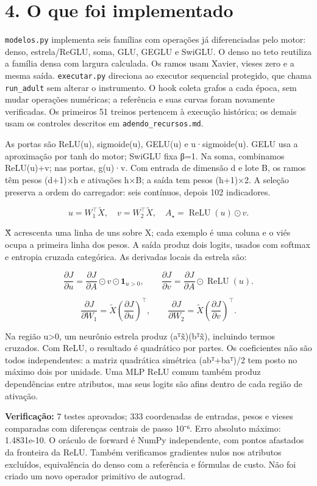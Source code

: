 \documentclass[10pt,a4paper]{article}
\begin{document}
\section*{4. O que foi implementado}
\texttt{modelos.py} implementa seis famílias com operações já diferenciadas pelo motor: denso, estrela/ReGLU, soma, GLU, GEGLU e SwiGLU. O denso no teto reutiliza a família densa com largura calculada. Os ramos usam Xavier, vieses zero e a mesma saída. \texttt{executar.py} direciona ao executor sequencial protegido, que chama \texttt{run\_\allowbreak{}adult} sem alterar o instrumento. O hook coleta grafos a cada época, sem mudar operações numéricas; a referência e suas curvas foram novamente verificadas. Os primeiros 51 treinos pertencem à execução histórica; os demais usam os controles descritos em \texttt{adendo\_\allowbreak{}recursos.md}.


As portas são ReLU(u), sigmoide(u), GELU(u) e u·sigmoide(u). GELU usa a aproximação por tanh do motor; SwiGLU fixa β=1. Na soma, combinamos ReLU(u)+v; nas portas, g(u)·v. Com entrada de dimensão d e lote B, os ramos têm pesos (d+1)×h e ativações h×B; a saída tem pesos (h+1)×2. A seleção preserva a ordem do carregador: seis contínuos, depois 102 indicadores.


\[
u=W_1^\top\widetilde X,\quad v=W_2^\top\widetilde X,\quad A_{\star}=\operatorname{ReLU}(u)\odot v.
\]

X̃ acrescenta uma linha de uns sobre X; cada exemplo é uma coluna e o viés ocupa a primeira linha dos pesos. A saída produz dois logits, usados com softmax e entropia cruzada categórica. As derivadas locais da estrela são:


\[
\frac{\partial J}{\partial u}=\frac{\partial J}{\partial A}\odot v\odot\mathbf{1}_{u>0},\qquad \frac{\partial J}{\partial v}=\frac{\partial J}{\partial A}\odot\operatorname{ReLU}(u).
\]

\[
\frac{\partial J}{\partial W_1}=\widetilde X\left(\frac{\partial J}{\partial u}\right)^\top,\qquad \frac{\partial J}{\partial W_2}=\widetilde X\left(\frac{\partial J}{\partial v}\right)^\top.
\]

Na região u>0, um neurônio estrela produz (aᵀx̃)(bᵀx̃), incluindo termos cruzados. Com ReLU, o resultado é quadrático por partes. Os coeficientes não são todos independentes: a matriz quadrática simétrica (abᵀ+baᵀ)/2 tem posto no máximo dois por unidade. Uma MLP ReLU comum também produz dependências entre atributos, mas seus logits são afins dentro de cada região de ativação.


\textbf{Verificação:} 7 testes aprovados; 333 coordenadas de entradas, pesos e vieses comparadas com diferenças centrais de passo 10⁻⁶. Erro absoluto máximo: 1.4831e-10. O oráculo de forward é NumPy independente, com pontos afastados da fronteira da ReLU. Também verificamos gradientes nulos nos atributos excluídos, equivalência do denso com a referência e fórmulas de custo. Não foi criado um novo operador primitivo de autograd.
\end{document}
